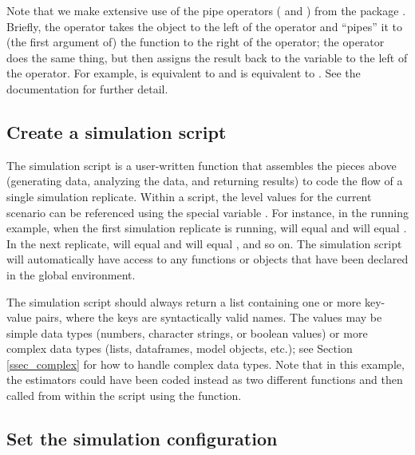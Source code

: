 Note that we make extensive use of the pipe operators (\code{\%>\%} and \code{\%<>\%}) from the  package \citep{bache2022magrittr}. Briefly, the operator \code{\%>\%} takes the object to the left of the operator and ``pipes'' it to (the first argument of) the function to the right of the operator; the operator \code{\%<>\%} does the same thing, but then assigns the result back to the variable to the left of the operator. For example,  is equivalent to  and  is equivalent to . See the  documentation for further detail.

\subsection{Create a simulation script}

The simulation script is a user-written function that assembles the pieces above (generating data, analyzing the data, and returning results) to code the flow of a single simulation replicate. Within a script, the level values for the current scenario can be referenced using the special variable . For instance, in the running example, when the first simulation replicate is running,  will equal  and  will equal . In the next replicate,  will equal  and  will equal , and so on. The simulation script will automatically have access to any functions or objects that have been declared in the global environment.


The simulation script should always return a list containing one or more key-value pairs, where the keys are syntactically valid names. The values may be simple data types (numbers, character strings, or boolean values) or more complex data types (lists, dataframes, model objects, etc.); see Section \ref{ssec_complex} for how to handle complex data types. Note that in this example, the estimators could have been coded instead as two different functions and then called from within the script using the  function.

\subsection{Set the simulation configuration}

